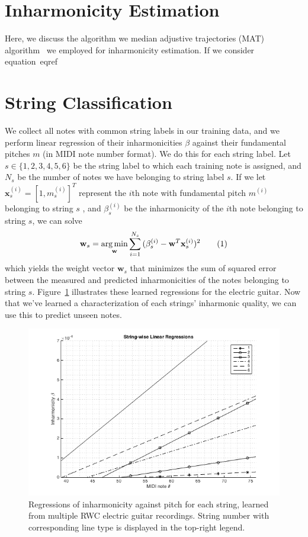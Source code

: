 \documentclass[12pt]{cmuthesis}
\DeclareMathOperator*{\argmin}{arg\,min}
\newcommand\addtag{\refstepcounter{equation}\tag{\theequation}}
\begin{document}
\section{Inharmonicity Estimation}
Here, we discuss the algorithm we median adjustive trajectories (MAT) algorithm~\cite{hodgkinson2010} we employed for inharmonicity estimation. If we consider equation~eqref\

\section{String Classification}
We collect all notes with common string labels in our training data, and we perform linear regression of their inharmonicities $\beta$ against their fundamental pitches $m$ (in MIDI note number format). We do this for each string label. Let $s \in \{1,2,3,4,5,6\}$ be the string label to which each training note is assigned, and $N_s$ be the number of notes we have belonging to string label $s$. If we let $\mathbf{x}_s^{(i)} = [1, m_s^{(i)}]^T$ represent the $i$th note with fundamental pitch $m^{(i)}$ belonging to string $s$ , and $\beta_s^{(i)}$ be the inharmonicity of the $i$th note belonging to string $s$, we can solve
\[
\mathbf{w}_s = \argmin_{\mathbf{w}}{\sum_{i=1}^{N_s}{(\beta^{(i)}_s - \mathbf{w}^T\mathbf{x}^{(i)}_s)^2}}\addtag
\]
which yields the weight vector $\mathbf{w}_s$ that minimizes the sum of squared error between the measured and predicted inharmonicities of the notes belonging to string $s$. Figure~\ref{fig:regressions} illustrates these learned regressions for the electric guitar. Now that we've learned a characterization of each strings' inharmonic quality, we can use this to predict unseen notes.

\begin{figure}[h] 
\label{fig:regressions}
\centering
\includegraphics[scale=0.8]{regressions}
\caption{Regressions of inharmonicity against pitch for each string, learned from multiple RWC electric guitar recordings. String number with corresponding line type is displayed in the top-right legend.}
\end{figure}
\end{document}
